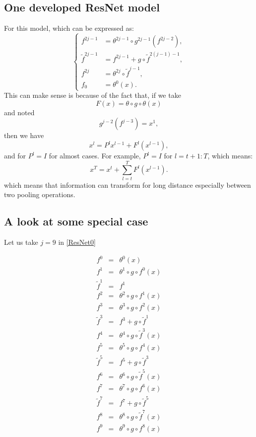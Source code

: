 \begin{enumerate}
\section{One developed ResNet model}
For this model, which can be expressed as:
\begin{equation}\label{I_ResNet_old}
	\begin{cases}
		f^{2j-1} &= \theta^{2j-1} \circ g^{2j-1}(f^{2j-2}), \\
		\tilde f^{2j-1} &= f^{2j-1} + g\circ \tilde f^{2(j-1)-1}, \\
		f^{2j} &= \theta^{2j} \circ \tilde f^{j-1},  \\
		f_0 &= \theta^0(x).
	\end{cases}
\end{equation}
This can make sense is because of the fact that, if we take 
\begin{equation}
F(x) = \theta \circ g \circ \theta(x)
\end{equation}
and noted
\begin{equation}
g^{j-2}(f^{j-3}) = x^1,
\end{equation}
then we have
\begin{equation}
x^l = P^lx^{l-1} + F^l(x^{l-1}),
\end{equation}
and for $P^{l} = I$ for almost cases.  For example, $P^l = I$ for $l = t+1: T$, which means:
\begin{equation}
x^T = x^t + \sum_{l=t}^{T} F^l(x^{l-1}).
\end{equation}
which means that information can transform for long distance especially between two pooling operations.

\newpage
\subsection{A look at some special case}
Let us take $j=9$ in \eqref{ResNet0}

\begin{equation}\label{ResNet9}
  \begin{array}{rcl}
f^0&=&\theta^0(x)\\    
f^1&=&\theta^1\circ g\circ f^0(x)\\    
\tilde f^1&=&f^1 \\
f^2&=&\theta^2\circ g\circ f^1(x)\\    
f^3&=&\theta^3\circ g\circ f^2(x)\\    
\tilde f^3&=&f^3+g\circ \tilde f^1 \\
f^4&=& \theta^4\circ g\circ \tilde f^3(x) \\
f^5&=&\theta^5\circ g\circ f^4(x)\\    
\tilde f^5&=&f^5+g\circ \tilde f^3 \\
f^6&=&\theta^6\circ g\circ \tilde f^5(x)\\    
f^7&=&\theta^7\circ g\circ f^6(x)\\  
\tilde f^7&=&f^7+g\circ \tilde f^5 \\
 f^8&=& \theta^8\circ g\circ\tilde f^7(x) \\ 
 f^9&=& \theta^9 \circ g \circ f^8(x)
  \end{array}
\end{equation}


\end{enumerate}
